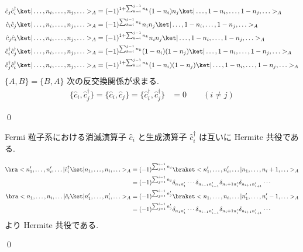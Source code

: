 \documentclass[uplatex,dvipdfmx,a4paper,11pt]{jlreq}
\makeatletter
\numberwithin{equation}{section}
\theoremstyle{definition}
\renewenvironment{proof}[1][\proofname]{\par
  \normalfont
  \topsep6\p@\@plus6\p@ \trivlist
  \item[\hskip\labelsep{\bfseries #1}\@addpunct{\bfseries}]\ignorespaces\quad\par
}{
  \qed\endtrivlist\@endpefalse
}
\renewcommand\proofname{証明}
\makeatother
\begin{document}
\begin{proof}
\begin{align}
    \hat{c}_j\hat{c}_i^\dagger\ket|\ldots,n_i,\ldots,n_j,\ldots>_A         & = (-1)^{1 + \sum_{k=i}^{j-1}n_k}(1 - n_i)n_j\ket|\ldots,1-n_i,\ldots,1-n_j,\ldots>_A       \\
    \hat{c}_i\hat{c}_j\ket|\ldots,n_i,\ldots,n_j,\ldots>_A                 & = (-1)^{\sum_{k=i}^{j-1}n_k}n_in_j\ket|\ldots,1-n_i,\ldots,1-n_j,\ldots>_A                 \\
    \hat{c}_j\hat{c}_i\ket|\ldots,n_i,\ldots,n_j,\ldots>_A                 & = (-1)^{1 + \sum_{k=i}^{j-1}n_k}n_in_j\ket|\ldots,1-n_i,\ldots,1-n_j,\ldots>_A             \\
    \hat{c}_i^\dagger\hat{c}_j^\dagger\ket|\ldots,n_i,\ldots,n_j,\ldots>_A & = (-1)^{\sum_{k=i}^{j-1}n_k}(1 - n_i)(1 - n_j)\ket|\ldots,1-n_i,\ldots,1-n_j,\ldots>_A     \\
    \hat{c}_j^\dagger\hat{c}_i^\dagger\ket|\ldots,n_i,\ldots,n_j,\ldots>_A & = (-1)^{1 + \sum_{k=i}^{j-1}n_k}(1 - n_i)(1 - n_j)\ket|\ldots,1-n_i,\ldots,1-n_j,\ldots>_A
  \end{align}
  $\{A, B\} = \{B, A\}$ 次の反交換関係が求まる.
  \begin{align}
    \{\hat{c}_i, \hat{c}_j^\dagger\} = \{\hat{c}_i, \hat{c}_j\} = \{\hat{c}_i^\dagger, \hat{c}_j^\dagger\} & = 0 \qquad (i\neq j)
  \end{align}
\end{proof}

\begin{proposition}[Q21-53(i)(ii)]
  Fermi 粒子系における消滅演算子 $\hat{c}_i$ と生成演算子 $\hat{c}_i^\dagger$ は互いに Hermite 共役である.
\end{proposition}
\begin{proof}
  \begin{align}
    \bra<n_1',\ldots,n_i',\ldots|\hat{c}_i^\dagger\ket|n_1,\ldots,n_i,\ldots>_A & = (-1)^{\sum_{j=1}^{i-1}n_j}\braket<n_1',\ldots,n_i',\ldots|n_1,\ldots,n_i+1,\ldots>_A                                        \\
                                                                                & = (-1)^{\sum_{j=1}^{i-1}n_j}\delta_{n_1n_1'}\cdots\delta_{n_{i-1}n_{i-1}'}\delta_{n_i+1n_{i}'}\delta_{n_{i+1}n_{i+1}'}\cdots  \\
    \bra<n_1,\ldots,n_i,\ldots|\hat{c}_i\ket|n_1',\ldots,n_i',\ldots>_A         & = (-1)^{\sum_{j=1}^{i-1}n_j'}\braket<n_1,\ldots,n_i,\ldots|n_1',\ldots,n_i'-1,\ldots>_A                                       \\
                                                                                & = (-1)^{\sum_{j=1}^{i-1}n_j'}\delta_{n_1n_1'}\cdots\delta_{n_{i-1}n_{i-1}'}\delta_{n_i+1n_{i}'}\delta_{n_{i+1}n_{i+1}'}\cdots
  \end{align}
  より Hermite 共役である.
\end{proof}
\end{document}
